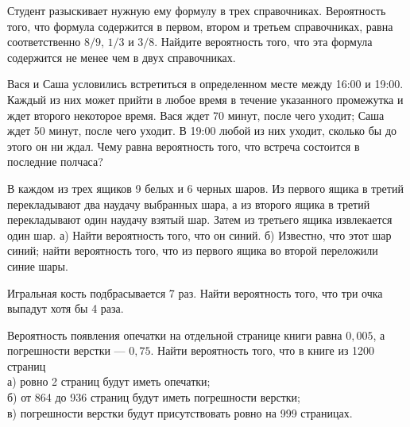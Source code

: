 \documentclass[12pt,a4paper,%
]{scrartcl}
\begin{document}
\vfill\newpage\setcounter{zad}{0}






\begin{zkrW}{20}\noindent Студент разыскивает нужную ему формулу в трех справочниках. Вероятность того, что формула содержится в первом, втором и третьем справочниках, равна соответственно $8/9$, $1/3$ и $3/8$. Найдите вероятность того, что эта формула содержится не менее чем в двух справочниках.
 \end{zkrW}

\vfill


\begin{zkrW}{20}\noindent Вася и Саша условились встретиться в определенном месте между 16:00 и 19:00. Каждый из них может прийти в любое время в течение указанного промежутка и ждет второго некоторое время. Вася ждет 70 минут, после чего уходит; Саша ждет 50 минут, после чего уходит. В 19:00 любой из них уходит, сколько бы до этого он ни ждал. Чему равна вероятность того, что встреча состоится в последние полчаса?
 \end{zkrW}

\vfill


\begin{zkrW}{20}\noindent В каждом из трех ящиков 9 белых и 6 черных шаров. Из первого ящика в третий перекладывают два наудачу выбранных шара, а из второго ящика в третий перекладывают один наудачу взятый шар. Затем из третьего ящика извлекается один шар. а) Найти вероятность того, что он синий. б) Известно, что этот шар синий; найти вероятность того, что из первого ящика во второй переложили синие шары.
 \end{zkrW}

\vfill



\begin{zkrW}{20}\noindent Игральная кость подбрасывается 7 раз. Найти вероятность того, что три очка выпадут хотя бы 4 раза.
 \end{zkrW}

\vfill



\begin{zkrW}{20}\noindent Вероятность появления опечатки на отдельной странице книги равна $0{,}005$, а погрешности верстки --- $0{,}75$. Найти вероятность того, что в книге из 1200 страниц \\ \indent а) ровно 2 страниц будут иметь опечатки; \\ \indent б) от 864 до 936 страниц будут иметь погрешности верстки; \\ в) \indent погрешности верстки будут присутствовать ровно на 999 страницах.
 \end{zkrW}
\end{document}
